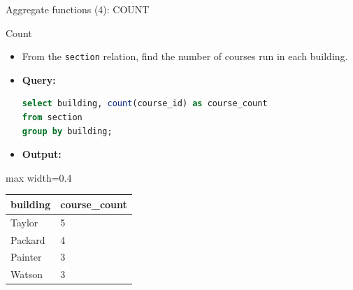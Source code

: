 \documentclass[aspectratio=169, xcolor=dvipsnames]{beamer}
\begin{document}
\begin{frame}[fragile]{Aggregate functions (4): COUNT}
    \begin{block}{Count}
        \begin{itemize}[<+->]
            \item From the \texttt{section} relation, find the number of courses run in each building.
            \item \textbf{Query:}
            \begin{lstlisting}[language=SQL]
select building, count(course_id) as course_count 
from section 
group by building;
            \end{lstlisting}
            \item \textbf{Output:}
        \end{itemize}
    \end{block}
    \begin{center}
        \begin{adjustbox}{max width=0.4\textwidth}
        \begin{tabular}{|l|l|}
        \hline
        \textbf{building} & \textbf{course\_count} \\ \hline
        Taylor & 5 \\ \hline
        Packard & 4 \\ \hline
        Painter & 3 \\ \hline
        Watson & 3 \\ \hline
        \end{tabular}
        \end{adjustbox}
    \end{center}
\end{frame}
\end{document}
